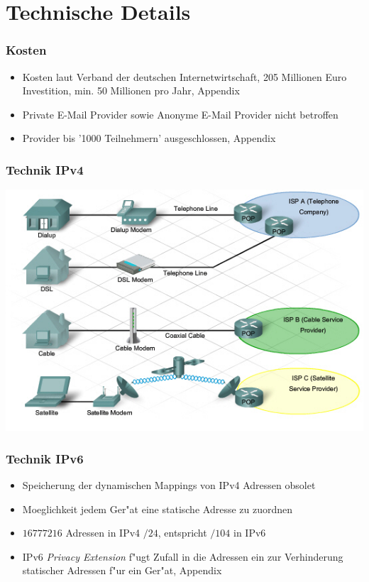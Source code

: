 
\section{Technische Details}
    \begin{frame}
      \frametitle{Kosten}
      \begin{itemize}
        \item 
          Kosten laut Verband der deutschen Internetwirtschaft, 205 Millionen Euro Investition, min. 50 Millionen pro Jahr, Appendix \cite{kostenVDS}
        \item
          Private E-Mail Provider sowie Anonyme E-Mail Provider nicht betroffen
        \item 
          Provider bis '1000  Teilnehmern' ausgeschlossen, Appendix \cite{emailAusnahme}
      \end{itemize}
    \end{frame}

  \begin{frame}
    \frametitle{Technik IPv4}
    \includegraphics[scale=0.65 ]{sections/img/internet_ipv4.jpg}
  \end{frame}

  \begin{frame}
    \frametitle{Technik IPv6}
    \begin{itemize}
      \item Speicherung der dynamischen Mappings von IPv4 Adressen obsolet
      \item Moeglichkeit jedem Ger"at eine statische Adresse zu zuordnen
      \item \( 16777216 \) Adressen in IPv4 \( /24 \), entspricht \( /104 \) in IPv6
      \item IPv6 {\em Privacy Extension} f"ugt Zufall in die Adressen ein zur Verhinderung statischer Adressen f"ur ein Ger"at, Appendix \cite{RFC4941}
    \end{itemize}
  \end{frame}